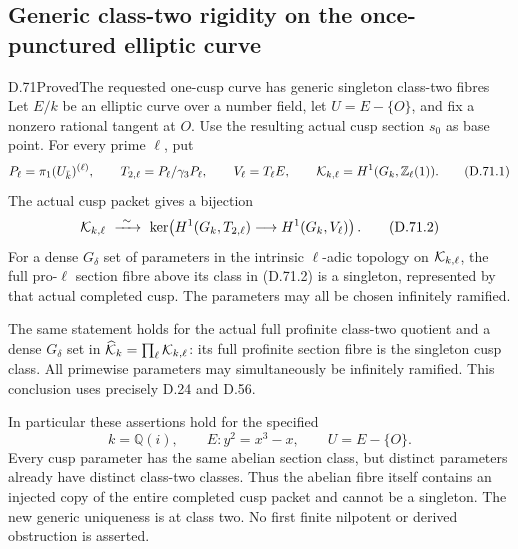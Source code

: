 \subsection{Generic class-two rigidity on the once-punctured elliptic curve}

\begin{statement}{D.71}{Proved}{The requested one-cusp curve has generic singleton class-two fibres}
Let \(E/k\) be an elliptic curve over a number field, let
\(U=E-\{O\}\), and fix a nonzero rational tangent at \(O\).
Use the resulting actual cusp section \(s_0\) as base point.
For every prime \(\ell\), put
\[
 P_\ell=\pi_1(U_{\bar k})^{(\ell)},\qquad
 T_{2,\ell}=P_\ell/\gamma_3P_\ell,\qquad
 V_\ell=T_\ell E,\qquad
 {\cal K}_{k,\ell}=H^1(G_k,\mathbb Z_\ell(1)).
                                                        \tag{D.71.1}
\]
The actual cusp packet gives a bijection
\[
 {\cal K}_{k,\ell}\ \xrightarrow{\ \sim\ }\
 \ker\!\left(H^1(G_k,T_{2,\ell})\longrightarrow
                                  H^1(G_k,V_\ell)\right).
                                                        \tag{D.71.2}
\]
For a dense \(G_\delta\) set of parameters in the intrinsic
\(\ell\)-adic topology on \({\cal K}_{k,\ell}\), the full
pro-\(\ell\) section fibre above its class in (D.71.2)
is a singleton, represented by that actual completed cusp.
The parameters may all be chosen infinitely ramified.

The same statement holds for the actual full profinite
class-two quotient and a dense \(G_\delta\) set in
\(\widehat{\cal K}_k=\prod_\ell{\cal K}_{k,\ell}\):
its full profinite section fibre is the singleton cusp
class. All primewise parameters may simultaneously
be infinitely ramified. This conclusion uses precisely
D.24 and D.56.

In particular these assertions hold for the specified
\[
 k=\mathbb Q(i),\qquad E:y^2=x^3-x,\qquad U=E-\{O\}.
                                                        \tag{D.71.3}
\]
Every cusp parameter has the same abelian section
class, but distinct parameters already have distinct
class-two classes. Thus the abelian fibre itself
contains an injected copy of the entire completed
cusp packet and cannot be a singleton. The new
generic uniqueness is at class two. No first finite
nilpotent or derived obstruction is asserted.
\end{statement}

